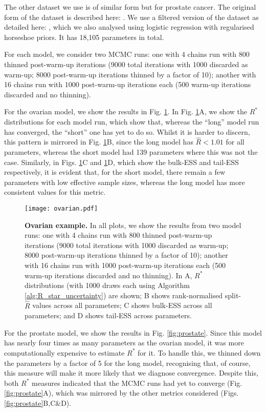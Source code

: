 \documentclass{article}
\begin{document}
The other dataset we use is of similar form but for prostate cancer. The original form of the dataset is described here: \cite{singh2002gene}. We use a filtered version of the dataset as detailed here: \cite{yang2006stable}, which we also analysed using logistic regression with regularised horseshoe priors. It has 18,105 parameters in total. 

For each model, we consider two MCMC runs: one with 4 chains run with 800 thinned post-warm-up iterations (9000 total iterations with 1000 discarded as warm-up; 8000 post-warm-up iterations thinned by a factor of 10); another with 16 chains run with 1000 post-warm-up iterations each (500 warm-up iterations discarded and no thinning).

For the ovarian model, we show the results in Fig. \ref{fig:ovarian}. In Fig. \ref{fig:ovarian}A, we show the $R^*$ distributions for each model run, which show that, whereas the ``long'' model run has converged, the ``short'' one has yet to do so. Whilst it is harder to discern, this pattern is mirrored in Fig. \ref{fig:ovarian}B, since the long model has $\widehat{R}<1.01$ for all parameters, whereas the short model had 139 parameters where this was not the case. Similarly, in Figs. \ref{fig:ovarian}C and \ref{fig:ovarian}D, which show the bulk-ESS and tail-ESS respectively, it is evident that, for the short model, there remain a few parameters with low effective sample sizes, whereas the long model has more consistent values for this metric.

\begin{figure}[!htb]
	\centerline{\texttt{[image: ovarian.pdf]}}
	\caption{\textbf{Ovarian example.} In all plots, we show the results from two model runs: one with 4 chains run with 800 thinned post-warm-up iterations (9000 total iterations with 1000 discarded as warm-up; 8000 post-warm-up iterations thinned by a factor of 10); another with 16 chains run with 1000 post-warm-up iterations each (500 warm-up iterations discarded and no thinning). In A, $R^*$ distributions (with 1000 draws each using Algorithm \ref{alg:R_star_uncertainty}) are shown; B shows rank-normalised split-$\widehat{R}$ values across all parameters; C shows bulk-ESS across all parameters; and D shows tail-ESS across parameters.}
	\label{fig:ovarian}
\end{figure}

For the prostate model, we show the results in Fig. \ref{fig:prostate}. Since this model has nearly four times as many parameters as the ovarian model, it was more computationally expensive to estimate $R^*$ for it. To handle this, we thinned down the parameters by a factor of 5 for the long model, recognising that, of course, this measure will make it more likely that we diagnose convergence. Despite this, both $R^*$ measures indicated that the MCMC runs had yet to converge (Fig. \ref{fig:prostate}A), which was mirrored by the other metrics considered (Figs. \ref{fig:prostate}B,C\&D).
\end{document}
